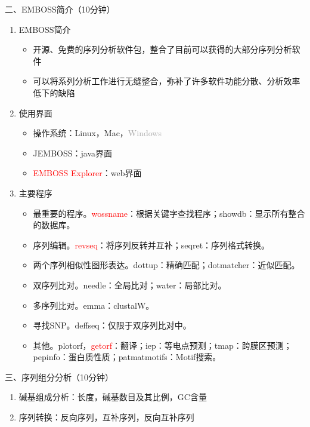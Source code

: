 \documentclass{TIJMUjiaoanSY}
\begin{document}
\vspace*{0.2cm}
\noindent
二、EMBOSS简介（10分钟）
\begin{enumerate}
  \item EMBOSS简介
  \begin{itemize}
    \item 开源、免费的序列分析软件包，整合了目前可以获得的大部分序列分析软件
    \item 可以将系列分析工作进行无缝整合，弥补了许多软件功能分散、分析效率低下的缺陷
  \end{itemize}
  \item 使用界面
  \begin{itemize}
    \item 操作系统：Linux，Mac，\textcolor{darkgray}{Windows}
    \item JEMBOSS：java界面
    \item \textcolor{red}{EMBOSS Explorer}：web界面
  \end{itemize}
  \item 主要程序
  \begin{itemize}
    \item 最重要的程序。\textcolor{red}{wossname}：根据关键字查找程序；showdb：显示所有整合的数据库。
    \item 序列编辑。\textcolor{red}{revseq}：将序列反转并互补；seqret：序列格式转换。
    \item 两个序列相似性图形表达。dottup：精确匹配；dotmatcher：近似匹配。
    \item 双序列比对。needle：全局比对；water：局部比对。
    \item 多序列比对。emma：clustalW。
    \item 寻找SNP。deffseq：仅限于双序列比对中。
    \item 其他。plotorf，\textcolor{red}{getorf}：翻译；iep：等电点预测；tmap：跨膜区预测；pepinfo：蛋白质性质；patmatmotifs：Motif搜索。
  \end{itemize}
\end{enumerate}

\vspace*{0.2cm}
\noindent
三、序列组分分析（10分钟）
\begin{enumerate}
  \item 碱基组成分析：长度，碱基数目及其比例，GC含量
  \item 序列转换：反向序列，互补序列，反向互补序列
\end{enumerate}


\otherTail
\newpage
\otherHeader
\end{document}
